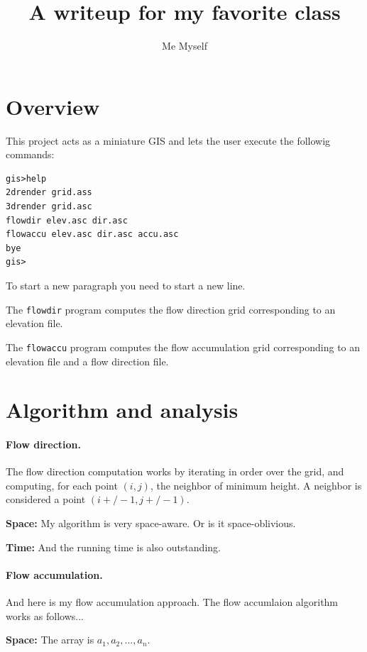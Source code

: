 \documentclass[11pt,twocolumn]{article}
\begin{document}
\title{A writeup for my favorite class}
\author{Me Myself}
\maketitle 



\section{Overview}

This project acts as a miniature GIS and lets the user execute the
followig commands: 
\begin{verbatim}
gis>help
2drender grid.ass
3drender grid.asc
flowdir elev.asc dir.asc
flowaccu elev.asc dir.asc accu.asc
bye
gis>
\end{verbatim}

To start a new paragraph you need to start a new line. 

The \texttt{flowdir}  program computes the flow direction grid
corresponding to an elevation file. 


The \texttt{flowaccu} program computes the flow accumulation grid
corresponding to an elevation file and a flow direction file.


\section{Algorithm and analysis}

\paragraph{Flow direction. }
The flow direction computation works by
iterating in order over the grid, and computing, for each point
$(i,j)$, the neighbor of minimum height. A neighbor is considered a
point $(i+/-1, j+/-1)$.

{\bf Space:} My algorithm is very space-aware. Or is it
space-oblivious. 

{\bf Time: } And the running time is also outstanding.


\paragraph{Flow accumulation.} And here is my flow accumulation
approach. The flow accumlaion algorithm works as follows...

{\bf Space:} The array is $a_1, a_2, ..., a_n$. 
\end{document}
